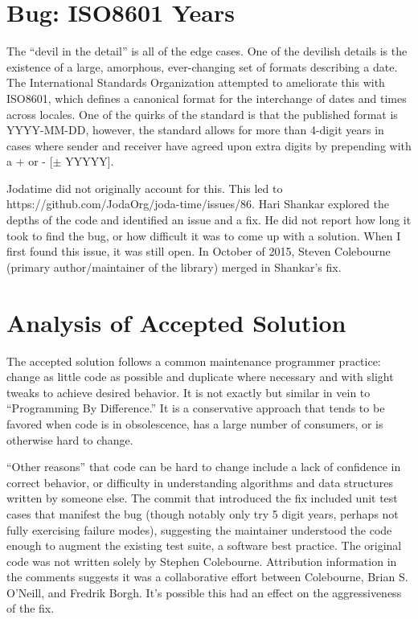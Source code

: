 \section{Bug: ISO8601 Years}

The “devil in the detail” is all of the edge cases. One of the devilish details is the existence of a large, amorphous, ever-changing set of formats describing a date. The International Standards Organization attempted to ameliorate this with ISO8601, which defines a canonical format for the interchange of dates and times across locales. One of the quirks of the standard is that the published format is YYYY-MM-DD, however, the standard allows for more than 4-digit years in cases where sender and receiver have agreed upon extra digits by prepending with a + or - [$\pm$ YYYYY].

Jodatime did not originally account for this. This led to https://github.com/JodaOrg/joda-time/issues/86. Hari Shankar explored the depths of the code and identified an issue and a fix. He did not report how long it took to find the bug, or how difficult it was to come up with a solution. When I first found this issue, it was still open. In October of 2015, Steven Colebourne (primary author/maintainer of the library) merged in Shankar’s fix.

\section{Analysis of Accepted Solution}

The accepted solution follows a common maintenance programmer practice: change as little code as possible and duplicate where necessary and with slight tweaks to achieve desired behavior. It is not exactly but similar in vein to “Programming By Difference.” It is a conservative approach that tends to be favored when code is in obsolescence, has a large number of consumers, or is otherwise hard to change.  

“Other reasons” that code can be hard to change include a lack of confidence in correct behavior, or difficulty in understanding algorithms and data structures written by someone else. The commit that introduced the fix included unit test cases that manifest the bug (though notably only try 5 digit years, perhaps not fully exercising failure modes), suggesting the maintainer understood the code enough to augment the existing test suite, a software best practice. The original code was not written solely by Stephen Colebourne. Attribution information in the comments suggests it was a collaborative effort between Colebourne, Brian S. O’Neill, and Fredrik Borgh. It’s possible this had an effect on the aggressiveness of the fix.

